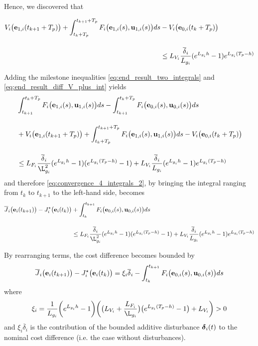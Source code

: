 Hence, we discovered that
\begin{bw_box}
\begin{align}
  V_i\big(\bm{\mathbf{e}}_{1,i}(t_{k+1} + T_p)\big)
  + \int_{t_k + T_p}^{t_{k+1} + T_p} F_i\big(\bm{\mathbf{e}}_{1,i}(s), \bm{\mathbf{u}}_{1,i}(s)\big) ds
  &- V_i\big(\bm{\mathbf{e}}_{0,i}(t_k + T_p)\big) \\[2.5ex]
  &\leq L_{V_i}\dfrac{\overline{\delta}_i}{L_{g_i}} (e^{L_{g_i}h} - 1) e^{L_{g_i} (T_p - h)}
  \label{eq:end_result_diff_V_plus_int}
\end{align}
\end{bw_box}

Adding the milestone inequalities \eqref{eq:end_result_two_integrals} and
\eqref{eq:end_result_diff_V_plus_int} yields
\begin{alignat}{2}
  &\int_{t_{k+1}}^{t_k + T_p} F_i \big(\vect{e}_{1,i}(s), \vect{u}_{1,i} (s)\big) d s
  - \int_{t_{k+1}}^{t_k + T_p} F_i \big(\vect{e}_{0,i}(s), \vect{u}_{0,i} (s)\big) d s \\[2.5ex]
  &+ V_i\big(\vect{e}_{1,i}(t_{k+1} + T_p)\big)
  + \int_{t_k + T_p}^{t_{k+1} + T_p} F_i\big(\vect{e}_{1,i}(s), \vect{u}_{1,i}(s)\big) ds
  - V_i\big(\vect{e}_{0,i}(t_k + T_p)\big) \\[2.5ex]
  &\leq L_{F_i} \dfrac{\overline{\delta}_i}{\L_{g_i}^2} (e^{L_{g_i} h} - 1) (e^{L_{g_i}(T_p-h)} - 1)
  + L_{V_i}\dfrac{\overline{\delta}_i}{L_{g_i}} (e^{L_{g_i}h} - 1) e^{L_{g_i} (T_p - h)}
\end{alignat}
and therefore \eqref{eq:convergence_4_integrals_2}, by bringing the integral
ranging from $t_k$ to $t_{k+1}$ to the left-hand side, becomes
\begin{align}
  \overline{J}_i\big(\vect{e}_i(t_{k+1})\big)
    - J_i^{\star}\big(\vect{e}_i(t_k)\big)
    &+ \int_{t_k}^{t_{k+1}} F_i \big(\vect{e}_{0,i}(s), \vect{u}_{0,i} (s)\big) d s \\[2.5ex]
    &\leq L_{F_i} \dfrac{\overline{\delta}_i}{\L_{g_i}^2} (e^{L_{g_i} h} - 1) (e^{L_{g_i}(T_p-h)} - 1)
  + L_{V_i}\dfrac{\overline{\delta}_i}{L_{g_i}} (e^{L_{g_i}h} - 1) e^{L_{g_i} (T_p - h)}
\end{align}

By rearranging terms, the cost difference becomes bounded by
\begin{align}
  \overline{J}_i\big(\bm{\mathbf{e}}_i(t_{k+1})\big) - J_i^{\star}\big(\bm{\mathbf{e}}_i(t_k)\big)
    = \xi_i \overline{\delta}_i -\int_{t_k}^{t_{k+1}} F_i \big(\bm{\mathbf{e}}_{0,i}(s), \bm{\mathbf{u}}_{0,i} (s)\big) d s
\end{align}
where
\begin{align}
  \xi_i =\dfrac{1}{L_{g_i}} \bigg(e^{L_{g_i}h} - 1\bigg)
    \bigg(\big(L_{V_i} + \dfrac{L_{F_i}}{\L_{g_i}}\big) \big(e^{L_{g_i}(T_p-h)}-1\big) + L_{V_i} \bigg) > 0
\end{align}
and $\xi_i \overline{\delta}_i$ is the contribution of the bounded additive
disturbance $\bm{\mathbf{\delta}}_i(t)$ to the nominal cost difference
(i.e. the case without disturbances).

